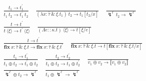 \documentclass{llncs}
\newcommand{\HOR}{\quad}
\newcommand{\VER}{\\[1.5ex]}
\newcommand{\RulX}[3]{\frac{#2}{#3}}
\newcommand{\Subst}[3]{#3[#1/#2]}
\newcommand{\ExnTy}{\widehat\tau}
\newcommand{\Exn}{\xi}
\newcommand{\Kind}{\kappa}                          %
\newcommand{\Tm}{t}
\newcommand{\TmVar}{x}
\newcommand{\TmVal}{v}
\newcommand{\TmExnVar}{e}
\newcommand{\TmAbsExn}[4]{\lambda #1 : #2\ \&\ #3. #4}
\newcommand{\TmAnnAbs}[3]{\Lambda #1 :: #2. #3}
\newcommand{\TmApp}[2]{#1\ #2}
\newcommand{\TmAnnApp}[2]{#1\ \langle #2 \rangle}
\newcommand{\TmOp}[2]{#1 \oplus #2}
\newcommand{\TmCrash}[2]{\lightning_{#1}^{#2}}
\newcommand{\TmFix}[1]{\mathbf{fix}\ #1}
\newcommand{\TmFixExn}[4]{\mathbf{fix}\ #1 : #2\ \&\ #3. #4}
\newcommand{\ExnLbl}{\ell}
\newcommand{\Interp}[1]{\llbracket #1 \rrbracket}
\newcommand{\JudgeEval}[2]{{#1 \longrightarrow #2}}
\begin{document}
    \begin{gather*}
        \RulX{E-App}
             {\JudgeEval{\Tm_1}
                        {\Tm_1^\prime}
             }
             {\JudgeEval{\TmApp{\Tm_1}{\Tm_2}}
                        {\TmApp{\Tm_1^\prime}{\Tm_2}}
             }
        \quad
        \RulX{E-AppAbs}
             {}
             {\JudgeEval{\TmApp{(\TmAbsExn{\TmVar}{\ExnTy}{\Exn}{\Tm_1})}{\Tm_2}}
                        {\Subst{\Tm_2}{\TmVar}{\Tm_1}}
             }
        \HOR
        \RulX{E-AppExn}
             {}
             {\JudgeEval{\TmApp{\TmCrash{}{\ExnLbl}}{\Tm_2}}
                        {\TmCrash{}{\ExnLbl}}
             }
        \VER
        \RulX{E-AnnApp}
             {\JudgeEval{\Tm}
                        {\Tm^\prime}
             }
             {\JudgeEval{\TmAnnApp{\Tm}{\Exn}}
                        {\TmAnnApp{\Tm^\prime}{\Exn}}
             }
        \HOR
        \RulX{E-AnnAppAbs}
             {}
             {\JudgeEval{\TmAnnApp{(\TmAnnAbs{\TmExnVar}{\Kind}{\Tm})}{\Exn}}
                        {\Subst{\Exn}{\TmExnVar}{\Tm}}
             }
        \VER
        \RulX{E-Fix$_1$}
             {\JudgeEval{\Tm}
                        {\Tm^\prime}
             }
             {\JudgeEval{\TmFixExn{\TmVar}{\ExnTy}{\Exn}{\Tm}}
                        {\TmFixExn{\TmVar}{\ExnTy}{\Exn}{\Tm^\prime}}
             }
        \quad
        \RulX{E-Fix$_2$}
             {}
             {\JudgeEval{\TmFixExn{\TmVar}{\ExnTy}{\Exn}{\Tm}}
                        {\Subst{\TmFixExn{\TmVar}{\ExnTy}{\Exn}{\Tm}}{\TmVar}{\Tm}}
             }
        \VER
        \RulX{E-Op$_1$}
             {\JudgeEval{\Tm_1}{\Tm_1^\prime}}
             {\JudgeEval{\TmOp{\Tm_1}{\Tm_2}}{\TmOp{\Tm_1^\prime}{\Tm_2}}}
        \quad
        \RulX{E-Op$_2$}
             {\JudgeEval{\Tm_2}{\Tm_2^\prime}}
             {\JudgeEval{\TmOp{\Tm_1}{\Tm_2}}{\TmOp{\Tm_1}{\Tm_2^\prime}}}
        \HOR
        \RulX{E-Op}
             {}
             {\JudgeEval{\TmOp{\TmVal_1}{\TmVal_2}}{\Interp{\TmOp{\TmVal_1}{\TmVal_2}}}}
        \VER
        \RulX{E-OpExn$_1$}
             {}
             {\JudgeEval{\TmOp{\TmCrash{}{\ExnLbl}}{\Tm_2}}{\TmCrash{}{\ExnLbl}}}
        \quad
        \RulX{E-OpExn$_2$}
             {}
             {\JudgeEval{\TmOp{\Tm_1}{\TmCrash{}{\ExnLbl}}}{\TmCrash{}{\ExnLbl}}}
        \\[1.5ex]

\end{gather*}
\end{document}
